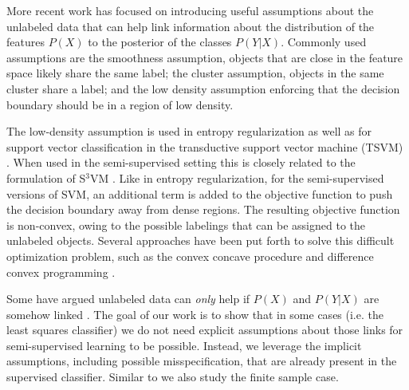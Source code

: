 \documentclass{llncs}
\begin{document}
More recent work has focused on introducing useful assumptions about the unlabeled data that can help link information about the distribution of the features $P(X)$ to the posterior of the classes $P(Y|X)$. Commonly used assumptions are the smoothness assumption, objects that are close in the feature space likely share the same label; the cluster assumption, objects in the same cluster share a label; and the low density assumption enforcing that the decision boundary should be in a region of low density. 


The low-density assumption is used in entropy regularization \cite{Grandvalet2005} as well as for support vector classification in the transductive support vector machine (TSVM)  \cite{Joachims1999}. When used in the semi-supervised setting this is closely related to the formulation of S$^3$VM \cite{Bennett1998,Sindhwani2006}. Like in entropy regularization, for the semi-supervised versions of SVM, an additional term is added to the objective function to push the decision boundary away from dense regions. The resulting objective function is non-convex, owing to the possible labelings that can be assigned to the unlabeled objects. Several approaches have been put forth to solve this difficult optimization problem, such as the convex concave procedure \cite{Collobert2006} and difference convex programming \cite{Sindhwani2006,Wang2007}.

Some have argued unlabeled data can \emph{only} help if $P(X)$ and $P(Y|X)$ are somehow linked \cite{Singh2008}. The goal of our work is to show that in some cases (i.e. the least squares classifier) we do not need explicit assumptions about those links for semi-supervised learning to be possible. Instead, we leverage the implicit assumptions, including possible misspecification, that are already present in the supervised classifier. Similar to \cite{Singh2008} we also study the finite sample case.
\end{document}
